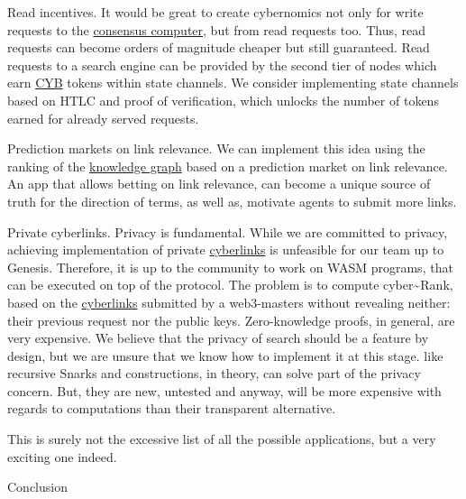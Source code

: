 \documentclass[8pt,oneside]{amsart}
\makeatletter
\newcommand{\linkgreen}[2]{\href{#1}{\color{green}{#2}}}
\renewcommand\subsection{\@startsection{subsection}
                                    {2}{\z@}
                                    {-3.25ex\@plus -1ex \@minus -.2ex}
                                    {0ex \@plus .2ex}
                                    {\play\Large}
                        }
\newcommand{\titleSection}[1]{\subsection{#1}}
\makeatother
\begin{document}
Read incentives. It would be great to create cybernomics not only for write requests to the {\hyperref[consensus-computer]{consensus computer}}, but from read requests too. Thus, read requests can become orders of magnitude cheaper but still guaranteed. Read requests to a search engine can be provided by the second tier of nodes which earn {\hyperref[cyb]{CYB}} tokens within state channels. We consider implementing state channels based on HTLC and proof of verification, which unlocks the number of tokens earned for already served requests.

Prediction markets on link relevance. We can implement this idea using the ranking of the {\hyperref[knowledge-graph]{knowledge graph}} based on a prediction market on link relevance. An app that allows betting on link relevance, can become a unique source of truth for the direction of terms, as well as, motivate agents to submit more links.

Private cyberlinks. Privacy is fundamental. While we are committed to privacy, achieving implementation of private {\hyperref[cyberlinks]{cyberlinks}} is unfeasible for our team up to Genesis. Therefore, it is up to the community to work on WASM programs, that can be executed on top of the protocol. The problem is to compute cyber\~{}Rank, based on the {\hyperref[cyberlinks]{cyberlinks}} submitted by a web3-masters without revealing neither: their previous request nor the public keys. Zero-knowledge proofs, in general, are very expensive. We believe that the privacy of search should be a feature by design, but we are unsure that we know how to implement it at this stage. \linkgreen{https://ipfs.io/ipfs/Qmdje3AmtsfjX9edWAxo3LFhV9CTAXoUvwGR7wHJXnc2Gk}{Coda} like recursive Snarks and \linkgreen{https://ipfs.io/ipfs/Qmd99xmraYip9cVv8gRMy6Y97Bkij8qUYArGDME7CzFasg}{MimbleWimble} constructions, in theory, can solve part of the privacy concern. But, they are new, untested and anyway, will be more expensive with regards to computations than their transparent alternative.

This is surely not the excessive list of all the possible applications, but a very exciting one indeed.

\titleSection{Conclusion}\label{conclusion}
\end{document}
